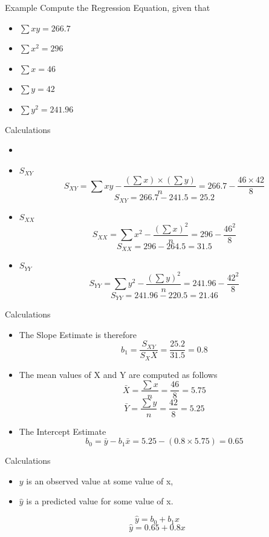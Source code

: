 \documentclass[]{report}
\begin{document}
{Example}
Compute the Regression Equation, given that
\begin{itemize}
	\item $\sum xy = 266.7 $
	\item $\sum x^2 = 296 $
	\item $\sum x = 46$	
	\item $\sum y =  42$	
	\item $\sum y^2 = 241.96$
\end{itemize}


{Calculations}
\begin{itemize}
	\item\item $S_{XY}$
	\[ S_{XY} = \sum xy - \frac{(\sum x)\times (\sum y)}{n} = 266.7 - \frac{46 \times 42}{8} \]
	\[ S_{XY} = 266.7-241.5  = 25.2 \]
	\item $S_{XX}$
	\[ S_{XX} = \sum x^2 - \frac{(\sum x)^2}{n} = 296 - \frac{46 ^2}{8}\]
	\[ S_{XX} = 296 - 264.5 = 31.5 \]
	
	\item $S_{YY}$
	\[ S_{YY} = \sum y^2 - \frac{(\sum y)^2}{n} = 241.96- \frac{42^2}{8} \]
	\[ S_{YY} = 241.96 - 220.5 =  21.46 \]
\end{itemize}



{Calculations}
\begin{itemize}
	\item The Slope Estimate is therefore
	\[ b_1 = \frac{S_{XY}}{S_XX} = \frac{25.2}{31.5} =  0.8 \]
	\item The mean values of X and Y are computed as follows
	\[ \bar{X}  = \frac{\sum x}{n} = \frac{46}{8} = 5.75 \]
	\[ \bar{Y}  = \frac{\sum y}{n} = \frac{42}{8} = 5.25 \]
	\item The Intercept Estimate 
	\[ b_0 = \bar{y} - b_1 \bar{x} = 5.25 - (0.8\times 5.75) =0.65 \] 
\end{itemize}



{Calculations}
\begin{itemize}
	\item $y$ is an observed value at some value of x,
	\item $\hat{y}$ is a predicted value for some value of x.
\end{itemize}

\[ \hat{y} = b_0 + b_1x \]
\[ \hat{y} = 0.65 + 0.8x \]
\end{document}
